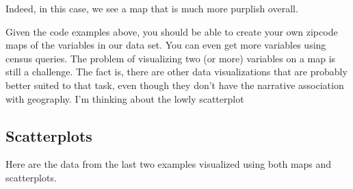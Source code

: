 \documentclass[openany]{book}
\begin{document}
Indeed, in this case, we see a map that is much more purplish overall.

Given the code examples above, you should be able to create your own zipcode maps of the variables in our data set. You can even get more variables using census queries. The problem of visualizing two (or more) variables on a map is still a challenge. The fact is, there are other data visualizations that are probably better suited to that task, even though they don't have the narrative association with geography. I'm thinking about the lowly scatterplot

\hypertarget{scatterplots}{%
\subsection*{Scatterplots}\label{scatterplots}}

Here are the data from the last two examples visualized using both maps and scatterplots.
\end{document}
